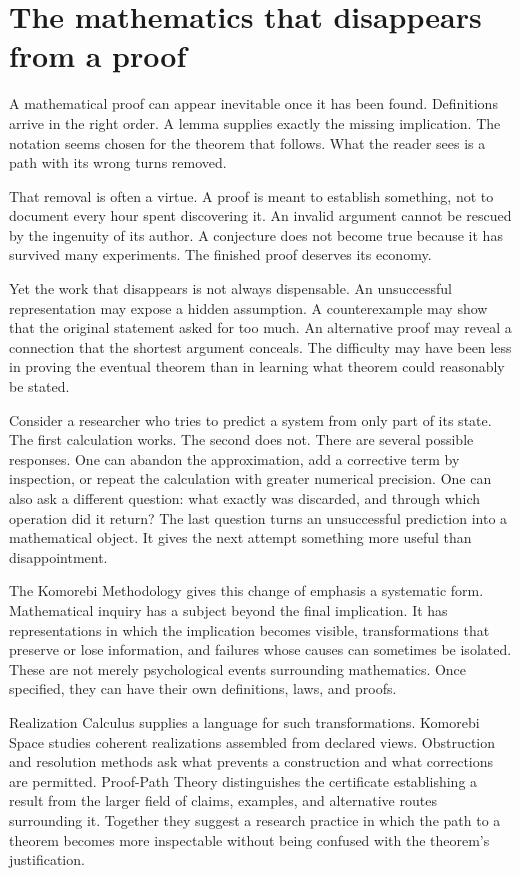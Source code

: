 \section{The mathematics that disappears from a proof}

A mathematical proof can appear inevitable once it has been found. Definitions arrive in the right order. A lemma supplies exactly the missing implication. The notation seems chosen for the theorem that follows. What the reader sees is a path with its wrong turns removed.

That removal is often a virtue. A proof is meant to establish something, not to document every hour spent discovering it. An invalid argument cannot be rescued by the ingenuity of its author. A conjecture does not become true because it has survived many experiments. The finished proof deserves its economy.

Yet the work that disappears is not always dispensable. An unsuccessful representation may expose a hidden assumption. A counterexample may show that the original statement asked for too much. An alternative proof may reveal a connection that the shortest argument conceals. The difficulty may have been less in proving the eventual theorem than in learning what theorem could reasonably be stated.

Consider a researcher who tries to predict a system from only part of its state. The first calculation works. The second does not. There are several possible responses. One can abandon the approximation, add a corrective term by inspection, or repeat the calculation with greater numerical precision. One can also ask a different question: what exactly was discarded, and through which operation did it return? The last question turns an unsuccessful prediction into a mathematical object. It gives the next attempt something more useful than disappointment.

The Komorebi Methodology gives this change of emphasis a systematic form. Mathematical inquiry has a subject beyond the final implication. It has representations in which the implication becomes visible, transformations that preserve or lose information, and failures whose causes can sometimes be isolated. These are not merely psychological events surrounding mathematics. Once specified, they can have their own definitions, laws, and proofs.

Realization Calculus supplies a language for such transformations. Komorebi Space studies coherent realizations assembled from declared views. Obstruction and resolution methods ask what prevents a construction and what corrections are permitted. Proof-Path Theory distinguishes the certificate establishing a result from the larger field of claims, examples, and alternative routes surrounding it. Together they suggest a research practice in which the path to a theorem becomes more inspectable without being confused with the theorem's justification.

